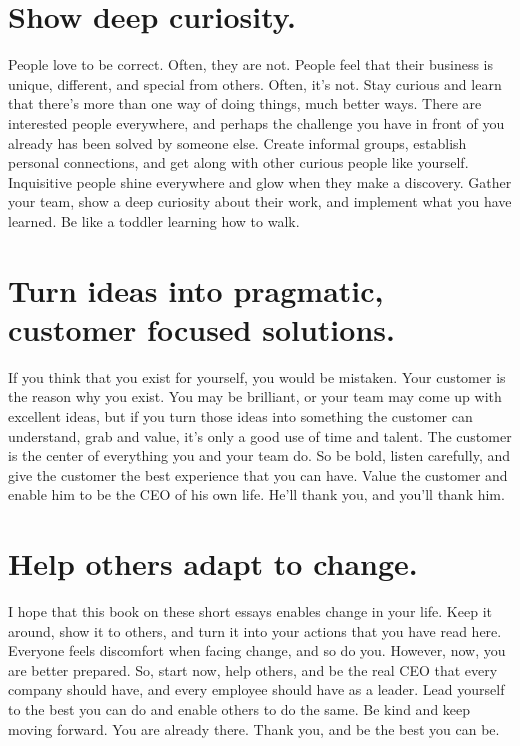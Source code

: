 \documentclass[10pt,a4paper]{book}
\begin{document}
\section{Show deep curiosity.}

People love to be correct. Often, they are not. People feel that their business is unique, different, and special from others. Often, it's not. Stay curious and learn that there's more than one way of doing things, much better ways. There are interested people everywhere, and perhaps the challenge you have in front of you already has been solved by someone else. Create informal groups, establish personal connections, and get along with other curious people like yourself. Inquisitive people shine everywhere and glow when they make a discovery. Gather your team, show a deep curiosity about their work, and implement what you have learned. Be like a toddler learning how to walk.

\section{Turn ideas into pragmatic, customer focused solutions.}

If you think that you exist for yourself, you would be mistaken. Your customer is the reason why you exist. You may be brilliant, or your team may come up with excellent ideas, but if you turn those ideas into something the customer can understand, grab and value, it's only a good use of time and talent. The customer is the center of everything you and your team do. So be bold, listen carefully, and give the customer the best experience that you can have. Value the customer and enable him to be the CEO of his own life. He'll thank you, and you'll thank him.

\section{Help others adapt to change.}

I hope that this book on these short essays enables change in your life. Keep it around, show it to others, and turn it into your actions that you have read here. Everyone feels discomfort when facing change, and so do you. However, now, you are better prepared. So, start now, help others, and be the real CEO that every company should have, and every employee should have as a leader. Lead yourself to the best you can do and enable others to do the same. Be kind and keep moving forward. You are already there. Thank you, and be the best you can be.
\end{document}
